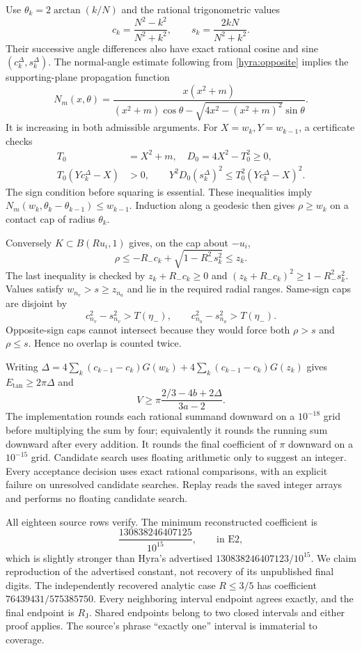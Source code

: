 \documentclass[11pt]{article}
\theoremstyle{remark}\newtheorem{remark}[theorem]{Remark}
\newcommand{\RJ}{R_{\mathrm J}}
\newcommand{\Et}{E_{\mathrm{tan}}}
\begin{document}
Use $\theta_k=2\arctan(k/N)$ and the rational trigonometric values
\[
 c_k=\frac{N^2-k^2}{N^2+k^2},\qquad s_k=\frac{2kN}{N^2+k^2}.
\]
Their successive angle differences also have exact rational cosine and sine $(c^\Delta_k,s^\Delta_k)$. The normal-angle estimate following from \eqref{hyra:opposite} implies the supporting-plane propagation function
\[
 N_m(x,\theta)=\frac{x(x^2+m)}{(x^2+m)\cos\theta-\sqrt{4x^2-(x^2+m)^2}\sin\theta}.
\]
It is increasing in both admissible arguments. For $X=w_k,Y=w_{k-1}$, a certificate checks
\begin{align*}
 T_0&=X^2+m,\quad D_0=4X^2-T_0^2\geq0,\\
 T_0(Yc^\Delta_k-X)&>0,\qquad
 Y^2D_0(s^\Delta_k)^2\leq T_0^2(Yc^\Delta_k-X)^2.
\end{align*}
The sign condition before squaring is essential. These inequalities imply $N_m(w_k,\theta_k-\theta_{k-1})\leq w_{k-1}$. Induction along a geodesic then gives $\rho\geq w_k$ on a contact cap of radius $\theta_k$.

Conversely $K\subset B(Ru_i,1)$ gives, on the cap about $-u_i$,
\[
 \rho\leq-R_-c_k+\sqrt{1-R_-^2s_k^2}\leq z_k.
\]
The last inequality is checked by $z_k+R_-c_k\geq0$ and $(z_k+R_-c_k)^2\geq1-R_-^2s_k^2$. Values satisfy $w_{n_v}>s\geq z_{n_a}$ and lie in the required radial ranges. Same-sign caps are disjoint by
\[
 c_{n_v}^2-s_{n_v}^2>T(\eta_-),\qquad
 c_{n_a}^2-s_{n_a}^2>T(\eta_-).
\]
Opposite-sign caps cannot intersect because they would force both $\rho>s$ and $\rho\leq s$. Hence no overlap is counted twice.

Writing $\Delta=4\sum_k(c_{k-1}-c_k)G(w_k)+4\sum_k(c_{k-1}-c_k)G(z_k)$ gives $\Et\geq2\pi\Delta$ and
\begin{equation}\label{hyra:capbound}
 V\geq\pi\frac{2/3-4b+2\Delta}{3a-2}.
\end{equation}
The implementation rounds each rational summand downward on a $10^{-18}$ grid before multiplying the sum by four; equivalently it rounds the running sum downward after every addition. It rounds the final coefficient of $\pi$ downward on a $10^{-15}$ grid. Candidate search uses floating arithmetic only to suggest an integer. Every acceptance decision uses exact rational comparisons, with an explicit failure on unresolved candidate searches. Replay reads the saved integer arrays and performs no floating candidate search.

All eighteen source rows verify. The minimum reconstructed coefficient is
\[
 \frac{130838246407125}{10^{15}},
 \qquad\text{in E2},
\]
which is slightly stronger than Hyra's advertised $130838246407123/10^{15}$. We claim reproduction of the advertised constant, not recovery of its unpublished final digits. The independently recovered analytic case $R\leq3/5$ has coefficient $76439431/575385750$. Every neighboring interval endpoint agrees exactly, and the final endpoint is $\RJ$. Shared endpoints belong to two closed intervals and either proof applies. The source's phrase ``exactly one'' interval is immaterial to coverage.
\end{document}
